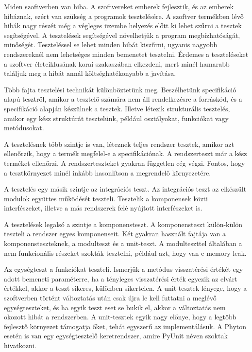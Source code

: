 
Miden szoftverben van hiba. A szoftvereket emberek fejlesztik, és az emberek hibáznak, ezért van szükség a programok tesztelésére. A szoftver termékben lévő hibák nagy részét még a végleges üzembe helyezés előtt ki lehet szűrni a tesztek segítségével. A tesztelések segítségével növelhetjük a program megbízhatóságát, minőségét. Teszteléssel se lehet minden hibát kiszűrni, ugyanis nagyobb rendszereknél nem lehetséges minden bemenetet tesztelni. Érdemes a teszteléseket a szoftver életciklusának korai szakaszában elkezdeni, mert minél hamarabb találjuk meg a hibát annál költséghatékonyabb a javítása.

Több fajta tesztelési technikát különböztetünk meg. Beszélhetünk specifikáció alapú tesztről, amikor a tesztelő számára nem áll rendelkezésre a forráskód, és a specifikáció alapján készülnek a tesztek. Illetve létezik strukturális tesztelés, amikor egy kész struktúrát tesztelünk, például osztályokat, funkciókat vagy metódusokat.


A tesztelésnek több szintje is van, léteznek teljes rendszer tesztek,	 amikor azt ellenőrzik, hogy a termék megfelel-e a specifikációnak. A rendszerteszt már a kész terméket ellenőrzi. A rendszerteszteket gyakran független cég végzi. Fontos, hogy a tesztkörnyezet minél inkább hasonlítson a megrendelő környezetére.

A tesztelés egy másik szintje az integrációs teszt. Az integrációs teszt az elkészült modulok együttes működését teszteli. Tesztelik a komponensek közti interfészeket, illetve a más rendszerek felé nyújtott interfészeket is.

A tesztelések legalsó a szintje a komponensteszt. A komponensteszt külön-külön teszteli a rendszer egyes komponenseit. Két gyakran használt fajtája van a komponensteszteknek, a modulteszt és a unit-teszt. A modulteszttel általában a nem-funkcionális részeket szokták tesztelni, például azt, hogy van e memory leak.


Az egységteszt a funkciókat teszteli. Ismerjük a metódus visszatérési értékét egy adott bemeneti paraméterre, ha a tényleges visszatérési érték egyezik az elvárt értékkel, akkor a teszt sikeres, különben sikertelen. A unit-tesztek lényege, hogy a szoftverben történt változtatás után csak újra le kell futtatni a meglévő egységteszteket, és ha egyik teszt eset se bukik el, akkor a változtatás nem okozott hibát a rendszerben.
A unit-tesztek egyik nagy előnye, hogy a legtöbb fejlesztő környezet támogatja őket, tehát egyszerű az implementálásuk. A Phyton esetén is van egy egységtesztelő keretrendszer, amire PyUnit néven szoktak hivatkozni.

